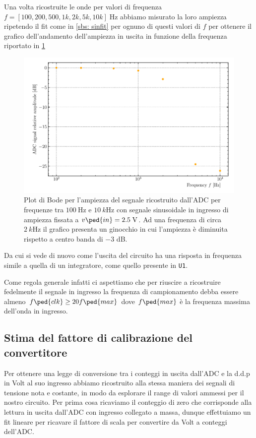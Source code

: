 \documentclass[10pt, a4paper, italian]{article}
\begin{document}
Una volta ricostruite le onde per valori di frequenza $f = [100, 200, 500, 1k,
2k, 5k, 10k] \; \si{\Hz}$ abbiamo misurato la loro ampiezza ripetendo il fit
come in \cref{sbs: sinfit} per ognuno di questi valori di $f$ per ottenere il
grafico dell'andamento dell'ampiezza in uscita in funzione della frequenza
riportato in \cref{fig: bode}
\begin{figure}[htbp]
	\centering
	\includegraphics[width=\textwidth]{bode}
	\caption{Plot di Bode per l'ampiezza del segnale ricostruito dall'ADC per
	frequenze tra $\SI{100}{\Hz}$ e $\SI{10}{k\Hz}$ con segnale sinusoidale in
	ingresso di ampiezza fissata a $v\ped{in} = 2.5 \; \si{\V}$. Ad
	una frequenza di circa $\SI{2}{k\Hz}$ il grafico presenta un ginocchio in
	cui l'ampiezza è diminuita rispetto a centro banda di $-3$ dB.
	\label{fig: bode}}
\end{figure}
Da cui si vede di nuovo come l'uscita del circuito ha una risposta in frequenza
simile a quella di un integratore, come quello presente in \verb+U1+.

Come regola generale infatti ci aspettiamo che per riuscire a ricostruire
fedelmente il segnale in ingresso la frequenza di campionamento debba essere
almeno $f\ped{clk} \geq 20 f\ped{max}$ dove $f\ped{max}$ è la frequenza
massima dell'onda in ingresso.

\subsection{Stima del fattore di calibrazione del convertitore}
Per ottenere una legge di conversione tra i conteggi in uscita dall'ADC e
la d.d.p in Volt al suo ingresso abbiamo ricostruito alla stessa maniera dei
segnali di tensione nota e costante, in modo da esplorare il range di valori
ammessi per il nostro circuito. Per prima cosa ricaviamo il conteggio di zero
che corrisponde alla lettura in uscita dall'ADC con ingresso collegato a massa,
dunque effettuiamo un fit lineare per ricavare il fattore di scala per
convertire da Volt a conteggi dell'ADC.
\end{document}
